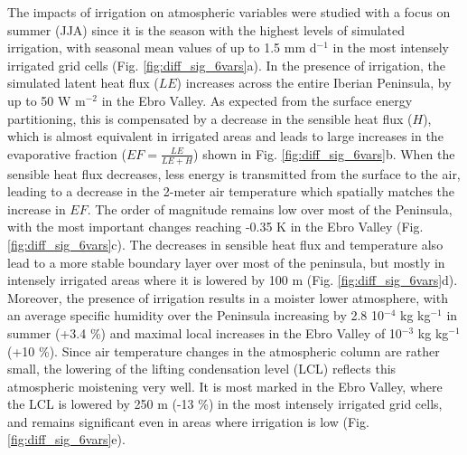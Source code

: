 The impacts of irrigation on atmospheric variables were studied with a focus on summer (JJA) since it is the season with the highest levels of simulated irrigation, with seasonal mean values of up to 1.5 mm d$^{-1}$ in the most intensely irrigated grid cells (Fig. \ref{fig:diff_sig_6vars}a).
In the presence of irrigation, the simulated latent heat flux ($LE$) increases across the entire Iberian Peninsula, by up to 50 W m$^{-2}$ in the Ebro Valley. As expected from the surface energy partitioning, this is compensated by a decrease in the sensible heat flux ($H$), which is almost equivalent in irrigated areas and leads to large increases in the evaporative fraction ($EF = \frac{LE}{LE+H}$) shown in Fig. \ref{fig:diff_sig_6vars}b.
When the sensible heat flux decreases, less energy is transmitted from the surface to the air, leading to a decrease in the 2-meter air temperature which spatially matches the increase in $EF$. The order of magnitude remains low over most of the Peninsula, with the most important changes reaching -0.35 K in the Ebro Valley (Fig. \ref{fig:diff_sig_6vars}c).
The decreases in sensible heat flux and temperature also lead to a more stable boundary layer over most of the peninsula, but mostly in intensely irrigated areas where it is lowered by 100 m (Fig. \ref{fig:diff_sig_6vars}d).
Moreover, the presence of irrigation results in a moister lower atmosphere, with an average specific humidity over the Peninsula increasing by 2.8 10$^{-4}$ kg kg$^{-1}$ in summer (+3.4 \%) and maximal local increases in the Ebro Valley of 10$^{-3}$ kg kg$^{-1}$ (+10 \%). Since air temperature changes in the atmospheric column are rather small, the lowering of the lifting condensation level (LCL) reflects this atmospheric moistening very well. It is most marked in the Ebro Valley, where the LCL is lowered by 250 m (-13 \%) in the most intensely irrigated grid cells, and remains significant even in areas where irrigation is low (Fig. \ref{fig:diff_sig_6vars}e).

